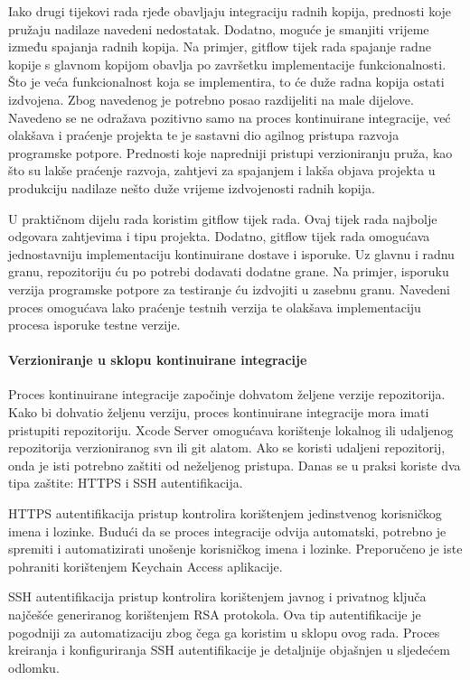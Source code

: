 \documentclass[times, utf8, diplomski, numeric]{fer}
\begin{document}
Iako drugi tijekovi rada rjeđe obavljaju integraciju radnih kopija, prednosti koje pružaju nadilaze navedeni nedostatak. Dodatno, moguće je smanjiti vrijeme između spajanja radnih kopija. Na primjer, gitflow tijek rada spajanje radne kopije s glavnom kopijom obavlja po završetku implementacije funkcionalnosti. Što je veća funkcionalnost koja se implementira, to će duže radna kopija ostati izdvojena. Zbog navedenog je potrebno posao razdijeliti na male dijelove. Navedeno se ne odražava pozitivno samo na proces kontinuirane integracije, već olakšava i praćenje projekta te je sastavni dio agilnog pristupa razvoja programske potpore. Prednosti koje napredniji pristupi verzioniranju pruža, kao što su lakše praćenje razvoja, zahtjevi za spajanjem i lakša objava projekta u produkciju nadilaze nešto duže vrijeme izdvojenosti radnih kopija.

U praktičnom dijelu rada koristim gitflow tijek rada. Ovaj tijek rada najbolje odgovara zahtjevima i tipu projekta. Dodatno, gitflow tijek rada omogućava jednostavniju implementaciju kontinuirane dostave i isporuke. Uz glavnu i radnu granu, repozitoriju ću po potrebi dodavati dodatne grane. Na primjer, isporuku verzija programske potpore za testiranje ću izdvojiti u zasebnu granu. Navedeni proces omogućava lako praćenje testnih verzija te olakšava implementaciju procesa isporuke testne verzije.

\paragraph{Verzioniranje u sklopu kontinuirane integracije}

Proces kontinuirane integracije započinje dohvatom željene verzije repozitorija. Kako bi dohvatio željenu verziju, proces kontinuirane integracije mora imati pristupiti repozitoriju. Xcode Server omogućava korištenje lokalnog ili udaljenog repozitorija verzioniranog svn ili git alatom. Ako se koristi udaljeni repozitorij, onda je isti potrebno zaštiti od neželjenog pristupa. Danas se u praksi koriste dva tipa zaštite: HTTPS i SSH autentifikacija.

HTTPS autentifikacija pristup kontrolira korištenjem jedinstvenog korisničkog imena i lozinke. Budući da se proces integracije odvija automatski, potrebno je spremiti i automatizirati unošenje korisničkog imena i lozinke. Preporučeno je iste pohraniti korištenjem Keychain Access aplikacije.

SSH autentifikacija pristup kontrolira korištenjem javnog i privatnog ključa najčešće generiranog korištenjem RSA protokola. Ova tip autentifikacije je pogodniji za automatizaciju zbog čega ga koristim u sklopu ovog rada. Proces kreiranja i konfiguriranja SSH autentifikacije je detaljnije objašnjen u sljedećem odlomku.
\end{document}
